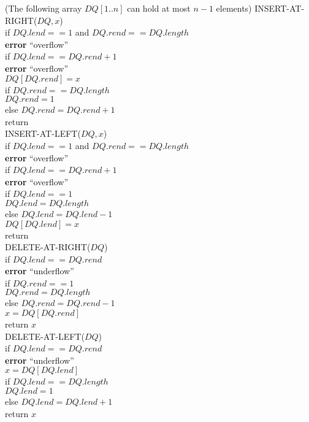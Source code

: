\documentclass[12pt, a4paper, UTF8]{ctexart}
\begin{document}
\begin{solution}
  (The following array $DQ[1..n]$ can hold at most $n-1$ elements)
  INSERT-AT-RIGHT($DQ,x$)\\
  \indent if $DQ.lend == 1$ and $DQ.rend == DQ.length$\\
  \indent\indent \textbf{error} ``overflow''\\
  \indent if $DQ.lend == DQ.rend + 1$\\
  \indent\indent \textbf{error} ``overflow''\\
  \indent $DQ[DQ.rend] = x$\\
  \indent if $DQ.rend == DQ.length$\\
  \indent\indent $DQ.rend = 1$\\
  \indent else $DQ.rend = DQ.rend + 1$\\
  \indent return\\
  INSERT-AT-LEFT($DQ,x$)\\
  \indent if $DQ.lend == 1$ and $DQ.rend == DQ.length$\\
  \indent\indent \textbf{error} ``overflow''\\
  \indent if $DQ.lend == DQ.rend + 1$\\
  \indent\indent \textbf{error} ``overflow''\\
  \indent if $DQ.lend == 1$\\
  \indent\indent $DQ.lend = DQ.length$\\
  \indent else $DQ.lend = DQ.lend - 1$\\
  \indent $DQ[DQ.lend] = x$\\
  \indent return\\
  DELETE-AT-RIGHT($DQ$)\\
  \indent if $DQ.lend == DQ.rend$\\
  \indent\indent \textbf{error} ``underflow''\\
  \indent if $DQ.rend == 1$\\
  \indent\indent $DQ.rend = DQ.length$\\
  \indent else $DQ.rend = DQ.rend - 1$\\
  \indent $x = DQ[DQ.rend]$\\
  \indent return $x$\\
  DELETE-AT-LEFT($DQ$)\\
  \indent if $DQ.lend == DQ.rend$\\
  \indent\indent \textbf{error} ``underflow''\\
  \indent $x = DQ[DQ.lend]$\\
  \indent if $DQ.lend == DQ.length$\\
  \indent\indent $DQ.lend = 1$\\
  \indent else $DQ.lend = DQ.lend + 1$\\
  \indent return $x$
\end{solution}
\end{document}
